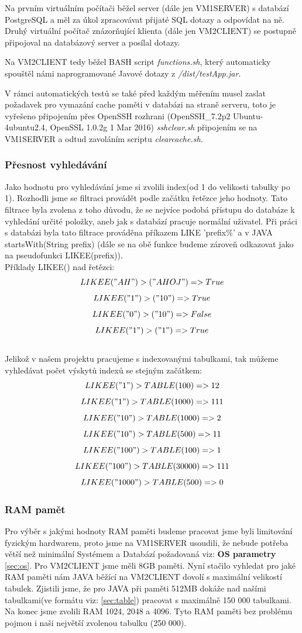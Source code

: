 \documentclass[a4paper, 11pt]{article}
\begin{document}
Na prvním virtuálním počítači běžel server (dále jen VM1SERVER) s databází PostgreSQL a měl za úkol zpracovávat přijaté SQL dotazy a odpovídat na ně.
Druhý virtuální počítač znázorňující klienta (dále jen VM2CLIENT) se postupně připojoval na databázový server a posílal dotazy. 

Na VM2CLIENT tedy běžel BASH \cite{bash_web} script \textit{functions.sh}, který automaticky spouštěl námi naprogramované Javové dotazy z \textit{/dist/testApp.jar}.

V rámci automatických testů se také před každým měřením musel zaslat požadavek pro vymazání cache paměti v databázi na straně serveru, toto je vyřešeno připojením přes OpenSSH rozhrani (OpenSSH\_7.2p2 Ubuntu-4ubuntu2.4, OpenSSL 1.0.2g  1 Mar 2016) \cite{openssh} \textit{sshclear.sh} připojením se na VM1SERVER a odtud zavoláním scriptu \textit{clearcache.sh}.

\subsubsection{Přesnost vyhledávání}

Jako hodnotu pro vyhledávání jsme si zvolili index(od 1 do velikosti tabulky po 1). Rozhodli jsme se filtraci provádět podle začátku řetězce jeho hodnoty. Tato filtrace byla zvolena z toho důvodu, že se nejvíce podobá přístupu do databáze k vyhledání určité položky, aneb jak s databází pracuje normální uživatel. Při práci s databázi byla tato filtrace prováděna příkazem LIKE 'prefix\%' \cite{sqllike} a v JAVA startsWith(String prefix) \cite{javalike} (dále se na obě funkce budeme zároveň odkazovat jako na pseudofunkci LIKEE(prefix)).
\\
Příklady LIKEE() nad řetězci:
$$LIKEE("AH") > ("AHOJ") => True$$
$$LIKEE("1") > ("10") => True$$
$$LIKEE("0") > ("10") => False$$
$$LIKEE("1") > ("1") => True$$
\\
Jelikož v našem projektu pracujeme s indexovanými tabulkami, tak můžeme vyhledávat počet výskytů indexů se stejným začátkem:
$$LIKEE("1") > TABLE(100) => 12$$
$$LIKEE("1") > TABLE(1000) => 111$$
$$LIKEE("10") > TABLE(1000) => 2$$
$$LIKEE("10") > TABLE(500)=> 11$$
$$LIKEE("100") > TABLE(100)=> 1$$
$$LIKEE("100") > TABLE(30000) => 111$$
$$LIKEE("1000") > TABLE(500) => 0$$

\subsubsection{RAM pamět}
Pro výběr s jakými hodnoty RAM paměti budeme pracovat jsme byli limitování fyzickým hardwarem, proto jsme na VM1SERVER usoudili, že nebude potřeba větší než minimální Systémem a Databází požadovaná viz: \textbf{OS parametry} \ref{sec:os}. Pro VM2CLIENT jsme měli 8GB paměti. Nyní stačilo vyhledat pro jaké RAM paměti nám JAVA běžící na VM2CLIENT dovolí s maximální velikostí tabulek. Zjistili jsme, že pro JAVA při paměti 512MB dokáže nad našími tabulkami(ve formátu viz: \ref{sec:table}) pracovat s maximálně 150 000 tabulkami. Na konec jsme zvolili RAM 1024, 2048 a 4096. Tyto RAM paměti bez problému pojmou i naši největší zvolenou tabulku (250 000).
\end{document}
